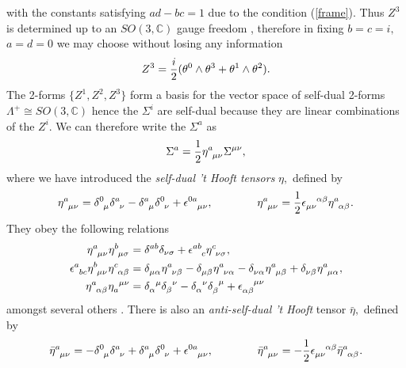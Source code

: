 \documentclass[a4paper,12pt, onecolumn, notitlepage]{article}
\theoremstyle{definition}
\theoremstyle{remark}
\newcommand{\al}{\alpha}
\newcommand{\m}{\mu}
\newcommand{\n}{\nu}
\newcommand{\e}{\epsilon}
\newcommand{\hooft}[3]{\eta\indices{^{#1}_{#2}_{#3}}}
\begin{document}
with the constants satisfying $ad-bc=1$ due to the condition (\ref{frame}). Thus $Z^{3}$ is determined up to an $SO(3,\mathbb{C})$ gauge freedom \cite{plebanski_1975}, therefore in fixing $b=c=i,$ $a=d=0$ we may choose without losing any information
\begin{equation*}
\label{z3}
	Z\indices{^3}=\frac{i}{2}(\theta\indices{^0}\wedge\theta\indices{^3} + \theta\indices{^1}\wedge\theta\indices{^2}).
\end{equation*}
The 2-forms $\{Z^{1},Z^{2}, Z^{3}\}$ form a basis for the vector space of self-dual 2-forms $\Lambda^{+}\cong SO(3,\mathbb{C})$ hence the $\Sigma^{i}$ are self-dual because they are linear combinations of the $Z^{i}.$ We can therefore write the $\Sigma^{a}$ as 
\begin{equation}
\Sigma^{a} =  \frac{1}{2}\hooft{a}{\mu}{\n}\Sigma\indices{^\m^\n},
\end{equation}
where we have introduced the \emph{self-dual 't Hooft tensors} $\eta,$ defined by
\begin{equation}
	\label{hooft1}
	\hooft{a}{\m}{\n} =  \delta\indices{^0_\mu}\delta\indices{^a_\nu} - \delta\indices{^a_\mu}\delta\indices{^0_\nu} + \epsilon\indices{^0^a_\mu_\nu},\qquad\qquad\hooft{a}{\m}{\n}=\frac{1}{2}\e\indices{_\m_\n^\al^\beta}\hooft{a}{\al}{\beta}.\\
\end{equation}
They obey the following relations
\begin{subequations}
	\begin{align}
	\label{hooft2}
	\hooft{a}{\m}{\n}\hooft{b}{\m}{\sigma} &= \delta^{ab}\delta_{\nu\sigma} + \epsilon\indices{^a^b_c}\hooft{c}{\nu}{\sigma},\\
	\label{hooft3}
	\e\indices{^a_b_c}\hooft{b}{\m}{\n}\hooft{c}{\al}{\beta}&=\delta\indices{_\m_\al}\hooft{a}{\n}{\beta}-\delta\indices{_\m_\beta}\hooft{a}{\n}{\al}-\delta\indices{_\n_\al}\hooft{a}{\m}{\beta}+\delta\indices{_\n_\beta}\hooft{a}{\m}{\al},\\
	\label{projection}
	\hooft{a}{\al}{\beta}\eta\indices{_{a}^{\mu}^{\nu}} &= \delta\indices{_\al^\mu}\delta\indices{_\beta^\nu} - \delta\indices{_\al^\nu}\delta\indices{_\beta^\mu} + \e\indices{_\al_\beta^\mu^\nu}
	\end{align}
\end{subequations}
amongst several others \cite{hooft_1976}. There is also an \emph{anti-self-dual 't Hooft} tensor $\bar{\eta},$ defined by
\begin{equation}
\label{asdhooft}
\bar{\eta}\indices{^a_\m_\n} =  -\delta\indices{^0_\mu}\delta\indices{^a_\nu} + \delta\indices{^a_\mu}\delta\indices{^0_\nu} + \epsilon\indices{^0^a_\mu_\nu},\qquad\qquad\bar{\eta}\indices{^a_\m_\n}=-\frac{1}{2}\e\indices{_\m_\n^\al^\beta}\bar{\eta}\indices{^a_\al_\beta}.\\
\end{equation}
\end{document}
